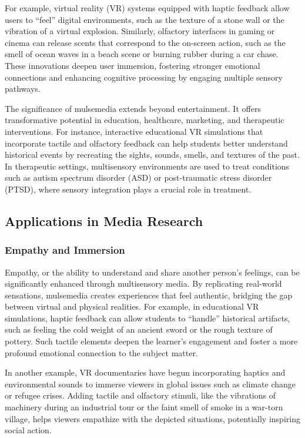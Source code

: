 \documentclass[
]{book}
\begin{document}
For example, virtual reality (VR) systems equipped with haptic feedback allow users to ``feel'' digital environments, such as the texture of a stone wall or the vibration of a virtual explosion. Similarly, olfactory interfaces in gaming or cinema can release scents that correspond to the on-screen action, such as the smell of ocean waves in a beach scene or burning rubber during a car chase. These innovations deepen user immersion, fostering stronger emotional connections and enhancing cognitive processing by engaging multiple sensory pathways.

The significance of mulsemedia extends beyond entertainment. It offers transformative potential in education, healthcare, marketing, and therapeutic interventions. For instance, interactive educational VR simulations that incorporate tactile and olfactory feedback can help students better understand historical events by recreating the sights, sounds, smells, and textures of the past. In therapeutic settings, multisensory environments are used to treat conditions such as autism spectrum disorder (ASD) or post-traumatic stress disorder (PTSD), where sensory integration plays a crucial role in treatment.

\subsection{Applications in Media Research}\label{applications-in-media-research}

\subsubsection{Empathy and Immersion}\label{empathy-and-immersion}

Empathy, or the ability to understand and share another person's feelings, can be significantly enhanced through multisensory media. By replicating real-world sensations, mulsemedia creates experiences that feel authentic, bridging the gap between virtual and physical realities. For example, in educational VR simulations, haptic feedback can allow students to ``handle'' historical artifacts, such as feeling the cold weight of an ancient sword or the rough texture of pottery. Such tactile elements deepen the learner's engagement and foster a more profound emotional connection to the subject matter.

In another example, VR documentaries have begun incorporating haptics and environmental sounds to immerse viewers in global issues such as climate change or refugee crises. Adding tactile and olfactory stimuli, like the vibrations of machinery during an industrial tour or the faint smell of smoke in a war-torn village, helps viewers empathize with the depicted situations, potentially inspiring social action.
\end{document}
